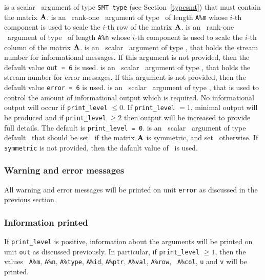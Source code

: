 \documentclass{galahad}
\begin{document}
\vspace*{-1mm}
\begin{description}
   is a scalar \intentinout\ argument of type {\tt SMT\_type} (see
     Section~\ref{typesmt}) that must contain the matrix ${\mathbf{A}}$.
   is an \optional\ rank-one \intentin\ argument of type \realdp\ of length
     {\tt A\%m} whose $i$-th component is used to scale the $i$-th
     row of the matrix ${\mathbf{A}}$.
   is an \optional\ rank-one \intentin\ argument of type \realdp\ of length
     {\tt A\%n} whose $i$-th component is used to scale the $i$-th
     column of the matrix ${\mathbf{A}}$.
   is an \optional\ scalar \intentin\ argument of type \integer, that holds the
     stream number for informational messages. If this argument is not
     provided, then the default value {\tt out = 6} is used.
   is an \optional\ scalar \intentin\ argument of type \integer, that holds the
     stream number for error messages. If this argument is not
     provided, then the default value {\tt error = 6} is used.
   is an \optional\ scalar \intentin\ argument of type \integer, that is used
     to control the amount of informational output which is required. No 
     informational output will occur if {\tt print\_level} $\leq 0$. If 
     {\tt print\_level} $= 1$, minimal output will be produced and if
     {\tt print\_level} $\geq 2$ then output will be
     increased to provide full details.
     The default is {\tt print\_level = 0}.
   is an \optional\ scalar \intentin\ argument of type default
     \logical\ that should be set \true\ if the matrix ${\mathbf{A}}$ is
     symmetric, and set \false\ otherwise.  If {\tt symmetric} is not
     provided, then the dafault value of \false\ is used. 
\end{description}

\subsubsection{Warning and error messages}\label{scaleA-error}

All warning and error messages will be printed on unit {\tt error} as
discussed in the previous section.

\subsubsection{Information printed}\label{scaleA-info}

If {\tt print\_level} is positive, information about the arguments
will be printed on unit {\tt out} as discussed previously.  In
particular, if {\tt print\_level} $\geq 1$, then the values {\tt
  A\%m}, {\tt A\%n}, {\tt A\%type}, {\tt A\%id},
{\tt A\%ptr}, {\tt A\%val}, {\tt A\%row}, {\tt
  A\%col}, {\tt u} and {\tt v} will be printed.
\end{document}
